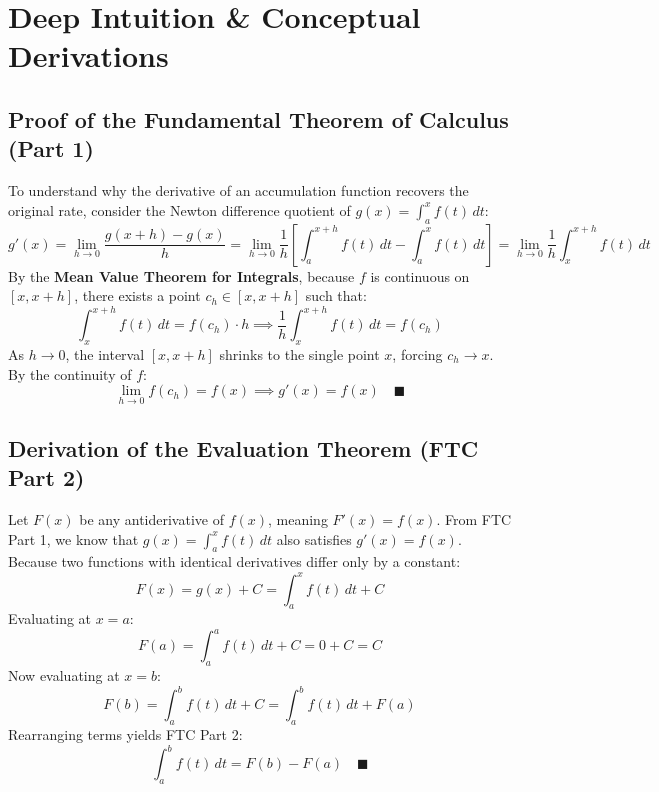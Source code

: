\section{Deep Intuition \& Conceptual Derivations}

\subsection{Proof of the Fundamental Theorem of Calculus (Part 1)}
To understand why the derivative of an accumulation function recovers the original rate, consider the Newton difference quotient of $g(x) = \int_a^x f(t) \, dt$:
\begin{equation}
g'(x) = \lim_{h \to 0} \frac{g(x+h) - g(x)}{h} = \lim_{h \to 0} \frac{1}{h} \left[ \int_a^{x+h} f(t) \, dt - \int_a^x f(t) \, dt \right] = \lim_{h \to 0} \frac{1}{h} \int_x^{x+h} f(t) \, dt
\end{equation}
By the \textbf{Mean Value Theorem for Integrals}, because $f$ is continuous on $[x, x+h]$, there exists a point $c_h \in [x, x+h]$ such that:
\begin{equation}
\int_x^{x+h} f(t) \, dt = f(c_h) \cdot h \implies \frac{1}{h} \int_x^{x+h} f(t) \, dt = f(c_h)
\end{equation}
As $h \to 0$, the interval $[x, x+h]$ shrinks to the single point $x$, forcing $c_h \to x$. By the continuity of $f$:
\begin{equation}
\lim_{h \to 0} f(c_h) = f(x) \implies g'(x) = f(x) \quad \blacksquare
\end{equation}

\subsection{Derivation of the Evaluation Theorem (FTC Part 2)}
Let $F(x)$ be any antiderivative of $f(x)$, meaning $F'(x) = f(x)$. From FTC Part 1, we know that $g(x) = \int_a^x f(t) \, dt$ also satisfies $g'(x) = f(x)$. 
Because two functions with identical derivatives differ only by a constant:
\begin{equation}
F(x) = g(x) + C = \int_a^x f(t) \, dt + C
\end{equation}
Evaluating at $x = a$:
\begin{equation}
F(a) = \int_a^a f(t) \, dt + C = 0 + C = C
\end{equation}
Now evaluating at $x = b$:
\begin{equation}
F(b) = \int_a^b f(t) \, dt + C = \int_a^b f(t) \, dt + F(a)
\end{equation}
Rearranging terms yields FTC Part 2:
\begin{equation}
\int_a^b f(t) \, dt = F(b) - F(a) \quad \blacksquare
\end{equation}


